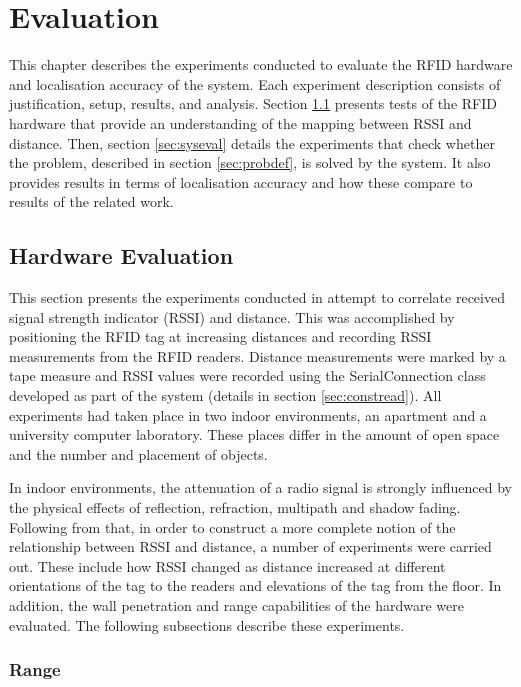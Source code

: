 \chapter{Evaluation}
\label{ch:evaluation}

This chapter describes the experiments conducted to evaluate the RFID hardware and localisation accuracy of the system. Each experiment description consists of justification, setup, results, and analysis. Section \ref{sec:hardeval} presents tests of the RFID hardware that provide an understanding of the mapping between RSSI and distance. Then, section \ref{sec:syseval} details the experiments that check whether the problem, described in section \ref{sec:probdef}, is solved by the system. It also provides results in terms of localisation accuracy and how these compare to results of the related work.

\section{Hardware Evaluation}
\label{sec:hardeval}

This section presents the experiments conducted in attempt to correlate received signal strength indicator (RSSI) and distance. This was accomplished by positioning the RFID tag at increasing distances and recording RSSI measurements from the RFID readers. Distance measurements were marked by a tape measure and RSSI values were recorded using the \textsf{SerialConnection} class developed as part of the system (details in section \ref{sec:constread}). All experiments had taken place in two indoor environments, an apartment and a university computer laboratory. These places differ in the amount of open space and the number and placement of objects.

In indoor environments, the attenuation of a radio signal is strongly influenced by the physical effects of reflection, refraction, multipath and shadow fading. Following from that, in order to construct a more complete notion of the relationship between RSSI and distance, a number of experiments were carried out. These include how RSSI changed as distance increased at different orientations of the tag to the readers and elevations of the tag from the floor. In addition, the wall penetration and range capabilities of the hardware were evaluated. The following subsections describe these experiments.

\subsection{Range}


